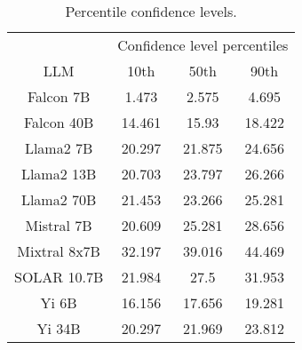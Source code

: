\begin{table*}
\centering
\begin{tabular}{c|c|c|c}
& \multicolumn{3}{c}{Confidence level percentiles} \\ 
LLM & 10th & 50th & 90th\\ \hline
Falcon 7B & 1.473 & 2.575 & 4.695\\
Falcon 40B & 14.461 & 15.93 & 18.422\\
Llama2 7B & 20.297 & 21.875 & 24.656\\
Llama2 13B & 20.703 & 23.797 & 26.266\\
Llama2 70B & 21.453 & 23.266 & 25.281\\
Mistral 7B & 20.609 & 25.281 & 28.656\\
Mixtral 8x7B & 32.197 & 39.016 & 44.469\\
SOLAR 10.7B & 21.984 & 27.5 & 31.953\\
Yi 6B & 16.156 & 17.656 & 19.281\\
Yi 34B & 20.297 & 21.969 & 23.812\\
\hline
\end{tabular}
\caption{Percentile confidence levels.}
\label{tab:percentile_conf}
\end{table*}
